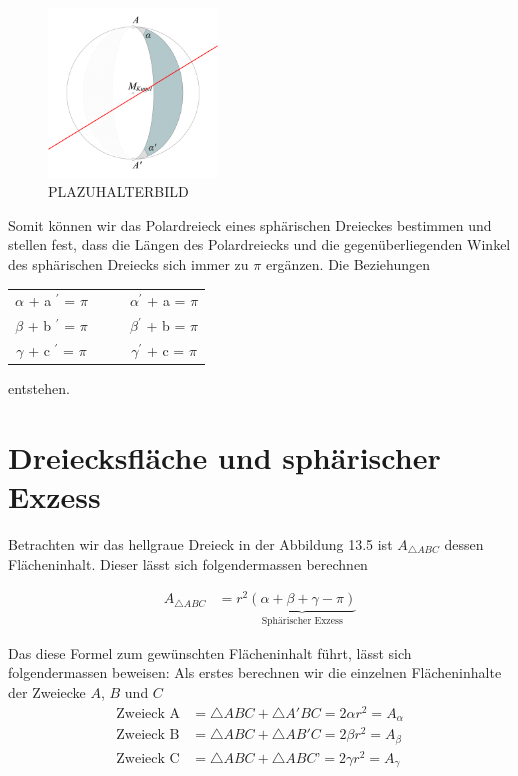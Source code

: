 \begin{refsection}
\begin{figure}[htbp]
\centering
\includegraphics[width=0.4\textwidth]{kugel/Zweieck.jpg}
\caption{PLAZUHALTERBILD}
\label{V8}
\end{figure}

Somit können wir das Polardreieck eines sphärischen Dreieckes bestimmen und stellen fest, dass die Längen des Polardreiecks und die gegenüberliegenden Winkel des sphärischen Dreiecks sich immer zu $\pi$ ergänzen. Die Beziehungen


\begin{center}
\renewcommand{\arraystretch}{2}
\begin{tabular}{cccc}
$\alpha$ + a $^{\prime}$ = $\pi$ & & & $\alpha ^{\prime}$ + a = $\pi$ \\
$\beta$ + b $^{\prime}$ = $\pi$ & & & $\beta ^{\prime}$ + b = $\pi$ \\
$\gamma$ + c $^{\prime}$ = $\pi$ & & & $\gamma ^{\prime}$ + c = $\pi$
\end{tabular}
\end{center}

entstehen.


\section{Dreiecksfläche und sphärischer Exzess} \label{Flaeche}
Betrachten wir das hellgraue Dreieck in der Abbildung 13.5 ist $A_{ \triangle{ ABC }}$ dessen Flächeninhalt. Dieser lässt sich folgendermassen berechnen

\begin{align*}
A_{ \triangle{ ABC }}  &= r^{ 2 }\underbrace{(\alpha + \beta + \gamma - \pi)}_{\text{Sphärischer Exzess}}
\end{align*}

Das diese Formel zum gewünschten Flächeninhalt führt, lässt sich folgendermassen beweisen:
Als erstes berechnen wir die einzelnen Flächeninhalte der Zweiecke $A$, $B$ und $C$
\begin{align*}
\text{Zweieck A}
&=
\triangle{ABC} + \triangle{A'BC} = 2 \alpha r^{ 2 } = A_{ \alpha }\\
\text{Zweieck B}
&=
\triangle{ABC} + \triangle{AB'C} = 2 \beta r^{ 2 } = A_{ \beta }\\
\text{Zweieck C}
&=
\triangle{ABC} + \triangle{ABC’} = 2 \gamma r^{ 2 } = A_{ \gamma }
\end{align*}


\end{refsection}
